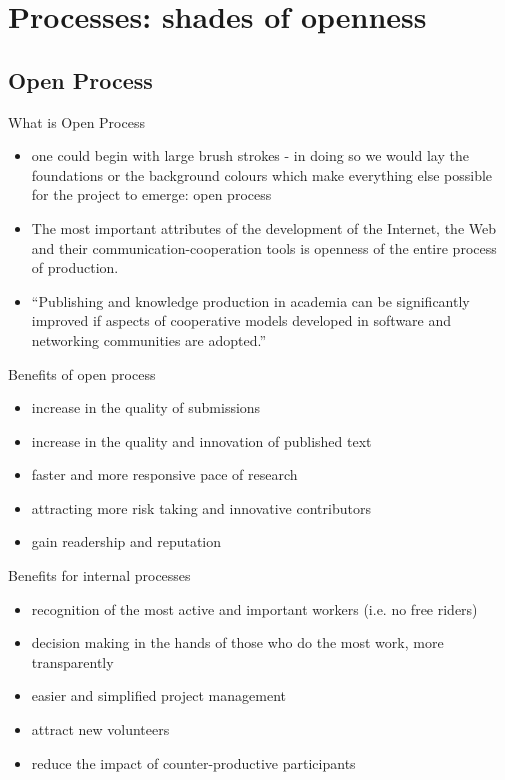 

\section{Processes: shades of openness}

\subsection{Open Process}

\begin{frame}{What is Open Process}{}

\begin{itemize}
\item one could begin with large brush strokes - in doing so we would lay the foundations or the background colours which make everything else possible for the project to emerge: open process

\item The most important attributes of the development of the Internet, the Web and their communication-cooperation 
  tools is openness of the entire process of production.

\item ``Publishing and knowledge production in academia can be significantly improved if aspects of cooperative models developed in software and networking communities are adopted.''  
\end{itemize}
\end{frame}

\begin{frame}{Benefits of open process}{}

\begin{itemize}
\item increase in the quality of submissions
\item increase in the quality and innovation of published text
\item faster and more responsive pace of research 
\item attracting more risk taking and innovative contributors 
\item gain readership and reputation 
\end{itemize}
\end{frame}

\begin{frame}{Benefits for internal processes}{}
\begin{itemize}
\item recognition of the most active and important workers (i.e. no free riders)
\item decision making in the hands of those who do the most work, more transparently
\item easier and simplified project management
\item attract new volunteers 
\item reduce the impact of counter-productive participants
\end{itemize}

\end{frame}


